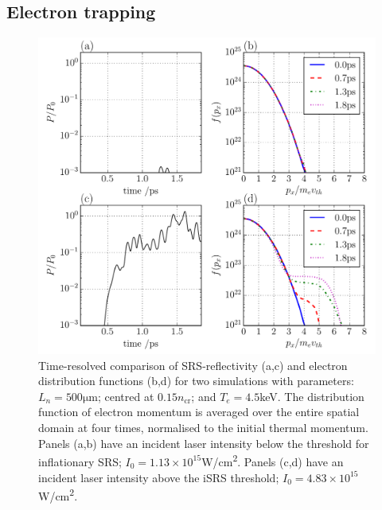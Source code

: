 \subsection{Electron trapping}


\begin{figure}[!ht]
 \centering
 \includegraphics[width=0.9\columnwidth]{Chapters/C4_iSRS/fig3_3a_3b_3c_3d.pdf}
 \caption{Time-resolved comparison of SRS-reflectivity (a,c) and electron distribution 
 functions (b,d) for two simulations with parameters: $L_n = 500 \si{\micro\metre} $; centred
 at $0.15n_\mathrm{cr}$; and $T_e = 4.5$\si{\kilo\electronvolt}. The distribution function of
 electron momentum is averaged over the entire spatial domain at four times, normalised to the initial thermal momentum. Panels (a,b) have an incident laser intensity below the threshold for inflationary SRS; $I_0 = 1.13\times10^{15}$\si{W/\centi\metre^2}. Panels (c,d) have an incident laser intensity above the iSRS threshold; $I_0 = 4.83\times10^{15}$\si{W/\centi\metre^2}.}
 \label{fig:reflAndDist}
\end{figure}

